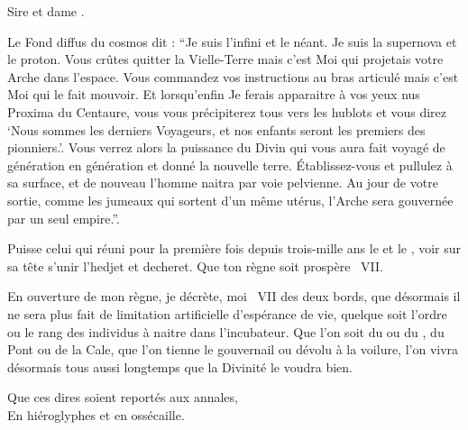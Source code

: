 \StageDir{}
\begin{drama}
  \huissierspeaks Sire \elena et dame \ela.


  \pretrespeaks {} Le Fond diffus du cosmos dit : \enquote{Je suis l’infini et le néant. Je suis la supernova et le proton. Vous crûtes quitter la Vielle-Terre mais c’est Moi qui projetais votre Arche dans l’espace. Vous commandez vos instructions au bras articulé mais c’est Moi qui le fait mouvoir. Et lorsqu’enfin Je ferais apparaitre à vos yeux nus Proxima du Centaure, vous vous précipiterez tous vers les hublots et vous direz \enquote{Nous sommes les derniers Voyageurs, et nos enfants seront les premiers des pionniers.}. Vous verrez alors la puissance du Divin qui vous aura fait voyagé de génération en génération et donné la nouvelle terre. Établissez-vous et pullulez à sa surface, et de nouveau l’homme naitra par voie pelvienne. Au jour de votre sortie, comme les jumeaux qui sortent d’un même utérus, l’Arche sera gouvernée par un seul empire.}.


   Puisse celui qui réuni pour la première fois depuis trois-mille ans le \campprincipal{} et le \campoppose{}, voir sur sa tête s’unir l’hedjet et decheret. Que ton règne soit prospère \elena~VII.

  \elenaspeaks En ouverture de mon règne, je décrète, moi \elena~VII des deux bords, que désormais il ne sera plus fait de limitation artificielle d’espérance de vie, quelque soit l’ordre ou le rang des individus à naitre dans l’incubateur. Que l’on soit du \campprincipal{} ou du \campoppose{}, du Pont ou de la Cale, que l’on tienne le gouvernail ou dévolu à la voilure, l’on vivra désormais tous aussi longtemps que la Divinité le voudra bien.

  \begin{minipage}[t]{\linewidth}
    Que ces dires soient reportés aux annales,\\
    En hiéroglyphes et en ossécaille.
  \end{minipage}


\end{drama}
